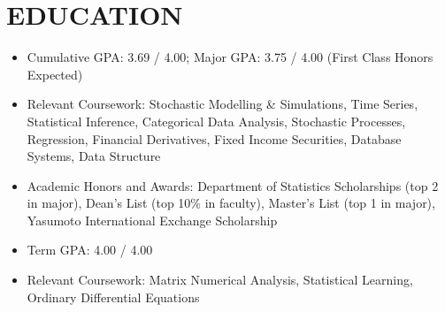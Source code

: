 \documentclass[classic]{resume}
\begin{document}
    \address{Wu Yee Sun College, CUHK, Shatin, N.T., Hong Kong SAR}
    \maketitle
    \section{EDUCATION}
    \begin{itemize}
        \item Cumulative GPA: 3.69 / 4.00; Major GPA: 3.75 / 4.00 (First Class Honors Expected)
        \item Relevant Coursework: Stochastic Modelling \& Simulations, Time Series, Statistical Inference, Categorical Data Analysis, Stochastic Processes, Regression, Financial Derivatives, Fixed Income Securities, Database Systems, Data Structure
        \item Academic Honors and Awards: Department of Statistics Scholarships (top 2 in major), Dean's List (top 10\% in faculty), Master's List (top 1 in major), Yasumoto International Exchange Scholarship
    \end{itemize}
    \begin{itemize}
        \item Term GPA: 4.00 / 4.00
        \item Relevant Coursework: Matrix Numerical Analysis, Statistical Learning, Ordinary Differential Equations
    \end{itemize}
\end{document}
